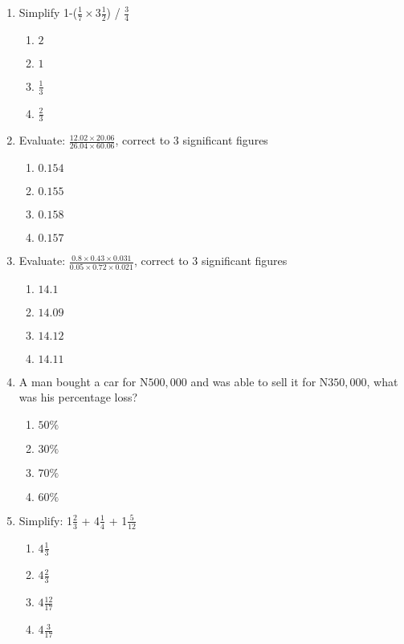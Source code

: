 \begin{multicols}{2}
\begin{enumerate}[label={\arabic*.}]
\begin{enumerate}[label={\Alph*.}]
    \end{enumerate}
\item Simplify 1-(\(\frac{1}{7} \times 3\frac{1}{2}\)) / \(\frac{3}{4}\)
    \begin{enumerate}[label={\Alph*.}]
    \item \(2\)
    \item \(1\)
    \item \(\frac{1}{3}\)
    \item \(\frac{2}{3}\)

    \end{enumerate}
\item Evaluate: \(\frac{12.02 \times 20.06}{26.04 \times 60.06}\), correct to 3 significant figures
    \begin{enumerate}[label={\Alph*.}]
    \item \(0.154\)
    \item \(0.155\)
    \item \(0.158\)
    \item \(0.157\)

    \end{enumerate}
\item Evaluate: \(\frac{0.8 \times 0.43 \times 0.031}{0.05 \times 0.72 \times 0.021}\), correct to 3 significant figures
    \begin{enumerate}[label={\Alph*.}]
    \item \(14.1\)
    \item \(14.09\)
    \item \(14.12\)
    \item \(14.11\)

    \end{enumerate}
\item A man bought a car for N\(500, 000\) and was able to sell it for N\(350, 000\), what was his percentage loss?
    \begin{enumerate}[label={\Alph*.}]
    \item \(50\%\)
    \item \(30\%\)
    \item \(70\%\)
    \item \(60\%\)
    

    \end{enumerate}
\item Simplify: 1\(\frac{2}{3}\) + 4\(\frac{1}{4}\) + 1\(\frac{5}{12}\)
    \begin{enumerate}[label={\Alph*.}]
    \item \(4\frac{1}{3}\)
    \item \(4\frac{2}{3}\)
    \item \(4\frac{12}{17}\)
    \item \(4\frac{3}{17}\)


\end{enumerate}
\end{enumerate}
\end{multicols}
